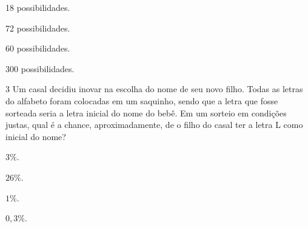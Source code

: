 \begin{escolha}[itemsep=0pt]
\item 18 possibilidades.
\item 72 possibilidades.
\item 60 possibilidades.
\item 300 possibilidades.
\end{escolha}









\num{3} Um casal decidiu inovar na escolha do nome de seu novo filho. Todas
as letras do alfabeto foram colocadas em um saquinho, sendo que a letra
que fosse sorteada seria a letra inicial do nome do bebê. Em um sorteio
em condições justas, qual é a chance, aproximadamente, de o filho do casal
ter a letra L como inicial do nome?

\begin{escolha}[itemsep=0pt]
\item $3\%$.
\item $26\%$.
\item $1\%$.
\item $0,3\%$.
\end{escolha}








